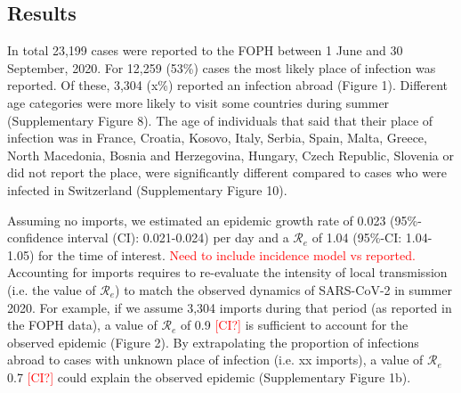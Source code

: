 \documentclass[10pt, a4paper, twoside]{article}
\begin{document}
\begin{multicols}{2}



\section{Results}
In total 23,199 cases were reported to the FOPH between 1 June and 30 September, 2020. 
For 12,259 (53\%) cases the most likely place of infection was reported.
Of these, 3,304 (x\%) reported an infection abroad (Figure 1). 
Different age categories were more likely to visit some countries during summer (Supplementary Figure 8). 
The age of individuals that said that their place of infection was in France, Croatia, Kosovo, Italy, Serbia, Spain, Malta, Greece, North Macedonia, Bosnia and Herzegovina, Hungary, Czech Republic, Slovenia  or did not report the place, were significantly different compared to cases who were infected in Switzerland (Supplementary Figure 10).

Assuming no imports, we estimated an epidemic growth rate of 0.023 (95\%-confidence interval (CI): 0.021-0.024) per day and a $\mathcal{R}_e$ of 1.04 (95\%-CI: 1.04-1.05) for the time of interest.
\textcolor{red}{Need to include incidence model vs reported.}
Accounting for imports requires to re-evaluate the intensity of local transmission (i.e. the value of $\mathcal{R}_e$) to match the observed dynamics of SARS-CoV-2 in summer 2020. 
For example, if we assume 3,304 imports during that period (as reported in the FOPH data), a value of $\mathcal{R}_e$ of 0.9 \textcolor{red}{[CI?]} is sufficient to account for the observed epidemic (Figure 2). 
By extrapolating the proportion of infections abroad to cases with unknown place of infection (i.e. xx imports), a value of $\mathcal{R}_e$ 0.7 \textcolor{red}{[CI?]} could explain the observed epidemic (Supplementary Figure 1b). 


\end{multicols}
\end{document}
